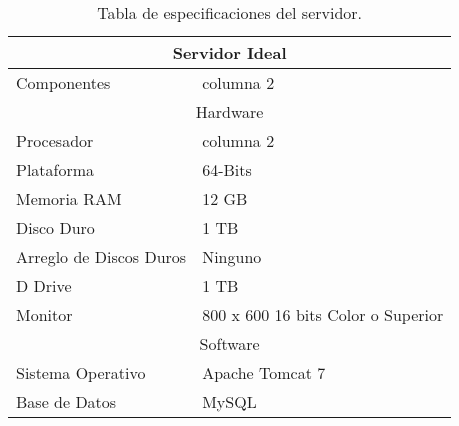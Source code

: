 	\begin{table}[htbp]
		\begin{center}
			\begin{tabular}{|l|l|}
				\hline
				\multicolumn{2}{|c|}{Servidor Ideal} \\
				\hline
				Componentes & columna 2\\
				\hline
				\multicolumn{2}{|c|}{Hardware} \\
				\hline
				Procesador & columna 2\\
				\hline
				Plataforma & 64-Bits\\
				\hline
				Memoria RAM & 12 GB\\
				\hline
				Disco Duro & 1 TB\\
				\hline
				Arreglo de Discos Duros & Ninguno\\
				\hline
				D Drive & 1 TB\\
				\hline
				Monitor & 800 x 600 16 bits Color o Superior\\
				\hline
				\multicolumn{2}{|c|}{Software} \\
				\hline
				Sistema Operativo & Apache Tomcat 7\\
				\hline
				Base de Datos & MySQL\\
				\hline 
			\end{tabular}
			\caption{Tabla de especificaciones del servidor.}
		\end{center}
	\end{table}
